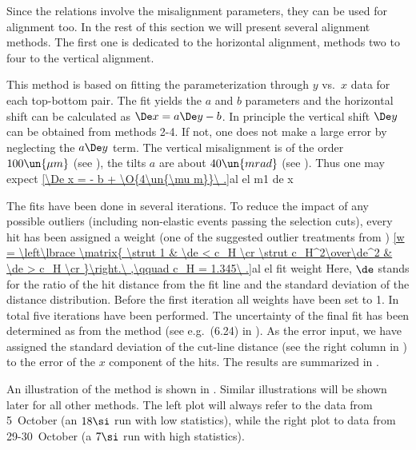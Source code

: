 Since the relations  involve the misalignment parameters, they can be used for alignment too. In the rest of this section we will present several alignment methods. The first one is dedicated to the horizontal alignment, methods two to four to the vertical alignment.



This method is based on fitting the parameterization  through $y$ vs.~$x$ data for each top-bottom  pair. The fit yields the $a$ and $b$ parameters and the horizontal shift can be calculated as $\De x = a \De y - b$. In principle the vertical shift $\De y$ can be obtained from methods 2-4. If not, one does not make a large error by neglecting the $a\De y$ term. The vertical misalignment is of the order $100\un{\mu m}$ (see ), the tilts $a$ are about $40\un{mrad}$ (see ). Thus one may expect
\eqref{\De x = - b + \O{4\un{\mu m}}\ .}{al el m1 de x}

The fits have been done in several iterations. To reduce the impact of any possible outliers (including non-elastic events passing the selection cuts), every hit has been assigned a weight (one of the suggested outlier treatments from )
\eqref{w = \left\lbrace \matrix{
\strut 1				& \de < c_H \cr
\strut c_H^2\over\de^2	& \de > c_H \cr
}\right.\ ,\qquad c_H = 1.345\ .}{al el fit weight}
Here, $\de$ stands for the ratio of the hit distance from the fit line and the standard deviation of the distance distribution. Before the first iteration all weights have been set to 1. In total five iterations have been performed. The uncertainty of the final fit has been determined as from the  method (see e.g.~(6.24) in ). As the error input, we have assigned the standard deviation of the cut-line distance (see the right column in ) to the error of the $x$ component of the hits. The results are summarized in .

An illustration of the method is shown in . Similar illustrations will be shown later for all other methods. The left plot will always refer to the data from 5~October (an $18\si$ run with low statistics), while the right plot to data from 29-30~October (a $7\si$ run with high statistics).

